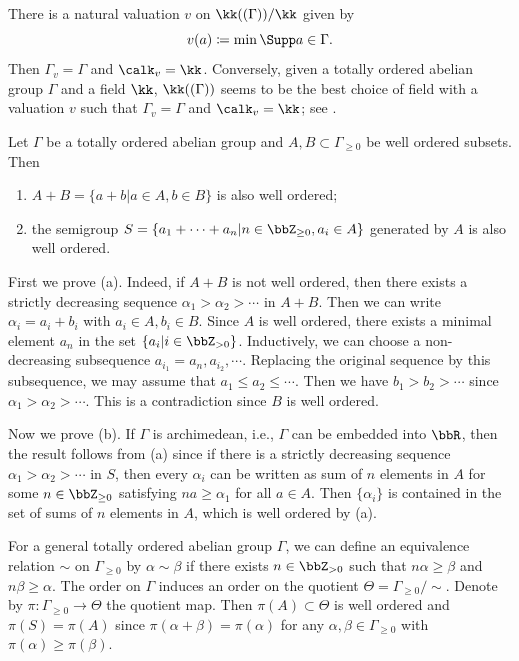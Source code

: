 \begin{construction}
	There is a natural valuation $v$ on $\kk((\Gamma))/\kk$ given by
	\[ v(a) \coloneqq \min \Supp a \in \Gamma. \]
	Then $\Gamma_v = \Gamma$ and $\calk_v = \kk$.
	Conversely, given a totally ordered abelian group $\Gamma$ and a field $\kk$, $\kk((\Gamma))$ seems to be the best choice of field with a valuation $v$ such that $\Gamma_v = \Gamma$ and $\calk_v = \kk$; see \Yang{}.
\end{construction}

\begin{remark}\label{rmk:well_orderedness_of_sum_of_well_ordered_sets}
	Let $\Gamma$ be a totally ordered abelian group and $A,B \subset \Gamma_{\geq 0}$ be well ordered subsets.
	Then
	\begin{enumerate}
		\item $A+B = \{a+b|a \in A, b \in B\}$ is also well ordered;
		\item the semigroup $S = \{a_1 + \cdots + a_n | n \in \bbZ_{\geq 0}, a_i \in A\}$ generated by $A$ is also well ordered.
	\end{enumerate}

	First we prove (a).
	Indeed, if $A+B$ is not well ordered, then there exists a strictly decreasing sequence $\alpha_1 > \alpha_2 > \cdots$ in $A+B$.
	Then we can write $\alpha_i = a_i + b_i$ with $a_i \in A, b_i \in B$.
	Since $A$ is well ordered, there exists a minimal element $a_n$ in the set $\{a_i|i \in \bbZ_{>0}\}$.
	Inductively, we can choose a non-decreasing subsequence $a_{i_1} = a_n, a_{i_2}, \cdots$.
	Replacing the original sequence by this subsequence, we may assume that $a_1 \leq a_2 \leq \cdots$.
	Then we have $b_1 > b_2 > \cdots$ since $\alpha_1 > \alpha_2 > \cdots$.
	This is a contradiction since $B$ is well ordered.

	Now we prove (b).
	If $\Gamma$ is archimedean, i.e., $\Gamma$ can be embedded into $\bbR$, then the result follows from (a) since if there is a strictly decreasing sequence $\alpha_1 > \alpha_2 > \cdots$ in $S$, then every $\alpha_i$ can be written as sum of $n$ elements in $A$ for some $n \in \bbZ_{\geq 0}$ satisfying $n a \geq \alpha_1$ for all $a \in A$.
	Then $\{\alpha_i\}$ is contained in the set of sums of $n$ elements in $A$, which is well ordered by (a).

	For a general totally ordered abelian group $\Gamma$,
	we can define an equivalence relation $\sim$ on $\Gamma_{\geq 0}$ by $\alpha \sim \beta$ if there exists $n \in \bbZ_{>0}$ such that $n\alpha \geq \beta$ and $n\beta \geq \alpha$.
	The order on $\Gamma$ induces an order on the quotient $\Theta = \Gamma_{\geq 0}/\sim$.
	Denote by $\pi: \Gamma_{\geq 0} \to \Theta$ the quotient map.
	Then $\pi(A) \subset \Theta$ is well ordered and $\pi(S) = \pi(A)$ since $\pi(\alpha+\beta) = \pi(\alpha)$ for any $\alpha,\beta \in \Gamma_{\geq 0}$ with $\pi(\alpha) \geq \pi(\beta)$.


\end{remark}
